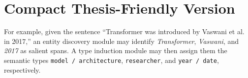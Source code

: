 \documentclass[12pt]{article}
\begin{document}
\vspace{0.8cm}

\section*{Compact Thesis-Friendly Version}

\noindent
For example, given the sentence ``Transformer was introduced by Vaswani et al. in 2017,'' an entity discovery module may identify \textit{Transformer}, \textit{Vaswani}, and \textit{2017} as salient spans. A type induction module may then assign them the semantic types \texttt{model / architecture}, \texttt{researcher}, and \texttt{year / date}, respectively.
\end{document}
